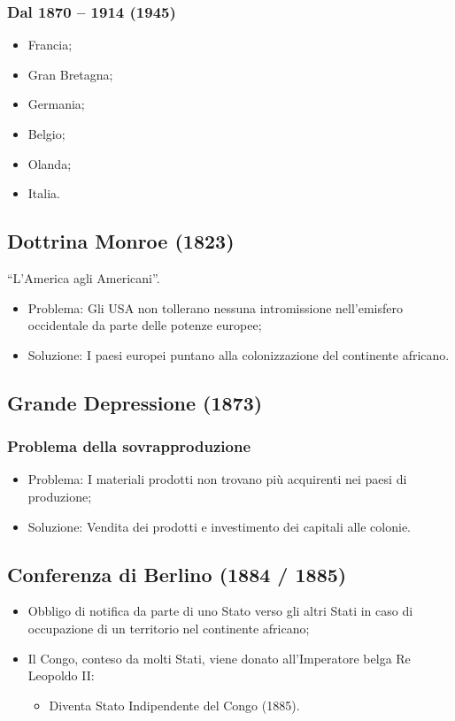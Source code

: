 \documentclass{article}
\begin{document}
\subsubsection{Dal 1870 – 1914 (1945)}
\begin{itemize}
    \item Francia;
    \item Gran Bretagna;
    \item Germania;
    \item Belgio;
    \item Olanda;
    \item Italia.
\end{itemize}

\subsection{Dottrina Monroe (1823)}
``L’America agli Americani''.
\begin{itemize}
    \item Problema: Gli USA non tollerano nessuna intromissione nell’emisfero occidentale da
        parte delle potenze europee;
    \item Soluzione: I paesi europei puntano alla colonizzazione del continente africano.
\end{itemize}

\subsection{Grande Depressione (1873)}

\subsubsection{Problema della sovrapproduzione}
\begin{itemize}
    \item Problema: I materiali prodotti non trovano più acquirenti nei paesi di produzione;
    \item Soluzione: Vendita dei prodotti e investimento dei capitali alle colonie.
\end{itemize}

\subsection{Conferenza di Berlino (1884 / 1885)}
\begin{itemize}
    \item Obbligo di notifica da parte di uno Stato verso gli altri Stati in caso di occupazione
        di un territorio nel continente africano;
    \item Il Congo, conteso da molti Stati, viene donato all’Imperatore belga Re Leopoldo II:
        \begin{itemize}
            \item Diventa Stato Indipendente del Congo (1885).
        \end{itemize}
\end{itemize}
\end{document}
